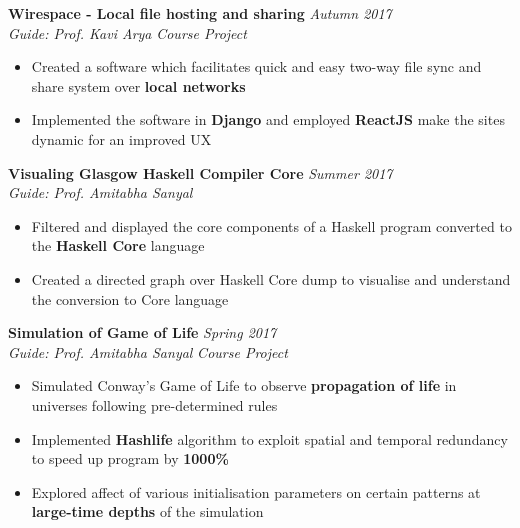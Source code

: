 \documentclass{article}
\begin{document}
\hspace{-14pt}\textbf{Wirespace - Local file hosting and sharing} \hfill{\sl Autumn 2017}\\
{\it Guide: Prof. Kavi Arya} \hfill{\sl Course Project}\\
\vspace{-17pt}
\begin{itemize}[itemsep = -0.75 mm, leftmargin=*]
	\item Created a software which facilitates quick and easy two-way file sync and share system over \textbf{local networks}
	\item Implemented the software in \textbf{Django} and employed \textbf{ReactJS} make the sites dynamic for an improved UX
\end{itemize}
\vspace{2pt}

\hspace{-14pt}\textbf{Visualing Glasgow Haskell Compiler Core} \hfill{\sl Summer 2017}\\
{\it Guide: Prof. Amitabha Sanyal}\\%
\vspace{-17pt}
\begin{itemize}[itemsep = -0.75 mm, leftmargin=*]
	\item Filtered and displayed the core components of a Haskell program converted to the \textbf{Haskell Core} language
	\item Created a directed graph over Haskell Core dump to visualise and understand the conversion to Core language
\end{itemize}
\vspace{2pt}

\hspace{-14pt}\textbf{Simulation of Game of Life} \hfill{\sl Spring 2017}\\
{\it Guide: Prof. Amitabha Sanyal} \hfill{\sl Course Project}\\
\vspace{-17pt}
\begin{itemize}[itemsep = -0.75 mm, leftmargin=*]
	\item Simulated Conway's Game of Life to observe \textbf{propagation of life} in universes following pre-determined rules
	\item Implemented \textbf{Hashlife} algorithm to exploit spatial and temporal redundancy to speed up program by \textbf{1000\%}
	\item Explored affect of various initialisation parameters on certain patterns at \textbf{large-time depths} of the simulation
\end{itemize}
\vspace{2pt}
\end{document}
